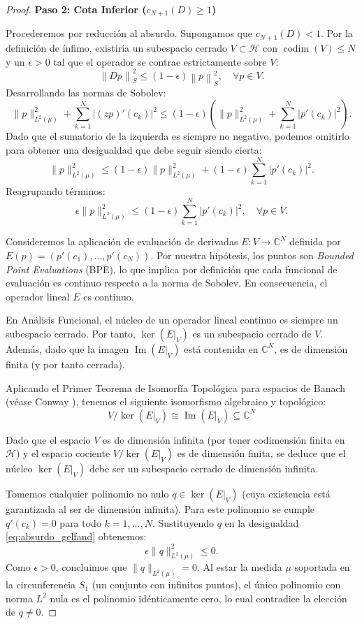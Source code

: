 \documentclass[12pt,a4paper]{article}
\theoremstyle{definition}
\theoremstyle{remark}
\newcommand{\C}{\mathbb{C}}
\newcommand{\norm}[1]{\left\| #1 \right\|_S}
\newcommand{\abs}[1]{\left| #1 \right|}
\begin{document}
\begin{proof}
    \textbf{Paso 2: Cota Inferior ($c_{N+1}(D) \ge 1$)}

    Procederemos por reducción al absurdo. Supongamos que $c_{N+1}(D) < 1$. Por la definición de ínfimo, existiría un subespacio cerrado $V \subset \mathcal{H}$ con $\operatorname{codim}(V) \le N$ y un $\epsilon > 0$ tal que el operador se contrae estrictamente sobre $V$:
    $$ \norm{Dp}^2 \le (1-\epsilon) \norm{p}^2, \quad \forall p \in V. $$
    Desarrollando las normas de Sobolev:
    $$ \|p\|_{L^2(\mu)}^2 + \sum_{k=1}^N \abs{(zp)'(c_k)}^2 \le (1-\epsilon) \left( \|p\|_{L^2(\mu)}^2 + \sum_{k=1}^N \abs{p'(c_k)}^2 \right). $$
    Dado que el sumatorio de la izquierda es siempre no negativo, podemos omitirlo para obtener una desigualdad que debe seguir siendo cierta:
    $$ \|p\|_{L^2(\mu)}^2 \le (1-\epsilon) \|p\|_{L^2(\mu)}^2 + (1-\epsilon) \sum_{k=1}^N \abs{p'(c_k)}^2. $$
    Reagrupando términos:
    \begin{equation} \label{eq:absurdo_gelfand}
        \epsilon \|p\|_{L^2(\mu)}^2 \le (1-\epsilon) \sum_{k=1}^N \abs{p'(c_k)}^2, \quad \forall p \in V.
    \end{equation}

    Consideremos la aplicación de evaluación de derivadas $E: V \to \C^N$ definida por $E(p) = (p'(c_1), \dots, p'(c_N))$.
    Por nuestra hipótesis, los puntos son \textit{Bounded Point Evaluations} (BPE), lo que implica por definición que cada funcional de evaluación es continuo respecto a la norma de Sobolev. En consecuencia, el operador lineal $E$ es continuo.

    En Análisis Funcional, el núcleo de un operador lineal continuo es siempre un subespacio cerrado. Por tanto, $\ker(E|_V)$ es un subespacio cerrado de $V$. Además, dado que la imagen $\operatorname{Im}(E|_V)$ está contenida en $\C^N$, es de dimensión finita (y por tanto cerrada).

    Aplicando el Primer Teorema de Isomorfía Topológica para espacios de Banach (véase Conway \cite{conway1990course}), tenemos el siguiente isomorfismo algebraico y topológico:
    $$ V / \ker(E|_V) \cong \operatorname{Im}(E|_V) \subseteq \C^N $$

    Dado que el espacio $V$ es de dimensión infinita (por tener codimensión finita en $\mathcal{H}$) y el espacio cociente $V / \ker(E|_V)$ es de dimensión finita, se deduce que el núcleo $\ker(E|_V)$ debe ser un subespacio cerrado de dimensión infinita.

    Tomemos cualquier polinomio no nulo $q \in \ker(E|_V)$ (cuya existencia está garantizada al ser de dimensión infinita). Para este polinomio se cumple $q'(c_k) = 0$ para todo $k=1, \dots, N$. Sustituyendo $q$ en la desigualdad \eqref{eq:absurdo_gelfand} obtenemos:
    $$ \epsilon \|q\|_{L^2(\mu)}^2 \le 0. $$
    Como $\epsilon > 0$, concluimos que $\|q\|_{L^2(\mu)} = 0$. Al estar la medida $\mu$ soportada en la circunferencia $S_1$ (un conjunto con infinitos puntos), el único polinomio con norma $L^2$ nula es el polinomio idénticamente cero, lo cual contradice la elección de $q \neq 0$.


\end{proof}
\end{document}
